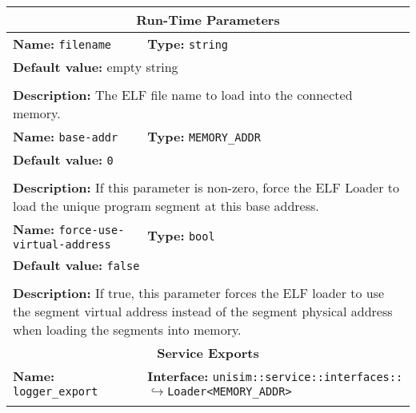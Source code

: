 \begin{center}
	\begin{tabular}{|p{7.5cm}|p{7.5cm}|}
		\hline
		\multicolumn{2}{|c|}{\textbf{\large Run-Time Parameters}}\\
		\hline
		\multicolumn{1}{|p{7.5cm}}{\textbf{Name:} \texttt{filename}} & \multicolumn{1}{p{7.5cm}|}{\textbf{Type:} \texttt{string}}\\
		\multicolumn{2}{|p{15cm}|}{\textbf{Default value:} empty string}\\
		\multicolumn{2}{|l|}{}\\
		\multicolumn{2}{|p{15cm}|}{\textbf{Description:} \newline The ELF file name to load into the connected memory.}\\
		\hline
		\multicolumn{1}{|p{7.5cm}}{\textbf{Name:} \texttt{base-addr}} & \multicolumn{1}{p{7.5cm}|}{\textbf{Type:} \texttt{MEMORY\_ADDR}}\\
		\multicolumn{2}{|p{15cm}|}{\textbf{Default value:} \texttt{0}}\\
		\multicolumn{2}{|l|}{}\\
		\multicolumn{2}{|p{15cm}|}{\textbf{Description:} \newline If this parameter is non-zero, force the ELF Loader to load the unique program segment at this base address.}\\
		\hline
		\multicolumn{1}{|p{7.5cm}}{\textbf{Name:} \texttt{force-use-virtual-address}} & \multicolumn{1}{p{7.5cm}|}{\textbf{Type:} \texttt{bool}}\\
		\multicolumn{2}{|p{15cm}|}{\textbf{Default value:} \texttt{false}}\\
		\multicolumn{2}{|l|}{}\\
		\multicolumn{2}{|p{15cm}|}{\textbf{Description:} \newline If true, this parameter forces the ELF loader to use the segment virtual address instead of the segment physical address when loading the segments into memory.}\\
		\hline
		\hline
		\multicolumn{2}{|c|}{\textbf{\large Service Exports}}\\
		\hline
		\multicolumn{1}{|p{7.5cm}}{\textbf{Name:} \texttt{logger\_export}} & \multicolumn{1}{p{7.5cm}|}{\textbf{Interface:} \newline \texttt{unisim::service::interfaces::} \newline$\hookrightarrow$\texttt{Loader<MEMORY\_ADDR>}}\\
		\multicolumn{2}{|l|}{}\\

\end{tabular}
\end{center}
